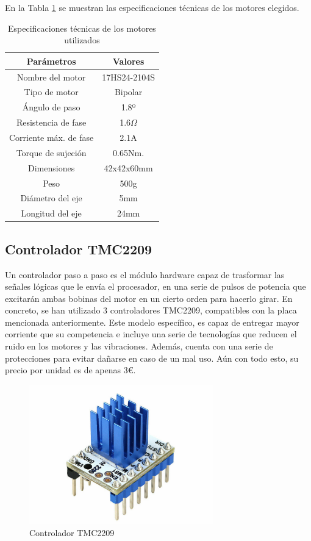 En la Tabla \ref{cuadro:nema17_60} se muestran las especificaciones técnicas de los motores elegidos.
\begin{table}[H]
\begin{center}
\begin{tabular}{|c|c|}
\hline
\textbf{Parámetros} & \textbf{Valores} \\
\hline
Nombre del motor & 17HS24-2104S \\
Tipo de motor & Bipolar \\
Ángulo de paso & 1.8º \\
Resistencia de fase & 1.6$\Omega$ \\
Corriente máx. de fase & 2.1A \\
Torque de sujeción & 0.65Nm. \\
Dimensiones & 42x42x60mm \\
Peso & 500g \\
Diámetro del eje & 5mm \\
Longitud del eje & 24mm \\
\hline
\end{tabular}
\caption{Especificaciones técnicas de los motores utilizados}
\label{cuadro:nema17_60}
\end{center}
\end{table}

\subsection{Controlador TMC2209}
\label{subsec:controladorPAP}
\noindent Un controlador paso a paso es el módulo hardware capaz de trasformar las señales lógicas que le envía el procesador, en una serie de pulsos de
potencia que excitarán ambas bobinas del motor en un cierto orden para hacerlo girar. 
En concreto, se han utilizado 3 controladores TMC2209, compatibles con la placa mencionada anteriormente. Este modelo específico, es capaz 
de entregar mayor corriente que su competencia e incluye una serie de tecnologías que reducen el ruido en los motores y las vibraciones. Además, 
cuenta con una serie de protecciones para evitar dañarse en caso de un mal uso. Aún con todo esto, su precio por unidad es de apenas 3\euro.
\begin{figure} [h!]
    \begin{center}
      \includegraphics[width=8cm]{figs/TMC2209.jpg}
    \end{center}
    \caption{Controlador TMC2209}
    \label{fig:robSoldering}
\end{figure}\ 

